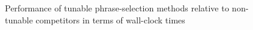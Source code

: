   \begin{figure}[!ht]
  \centering  
    \quad
    
    \caption{Performance of tunable phrase-selection methods relative to non-tunable competitors in terms of wall-clock times}
    
    \label{fig:non-tunable}
\end{figure}

